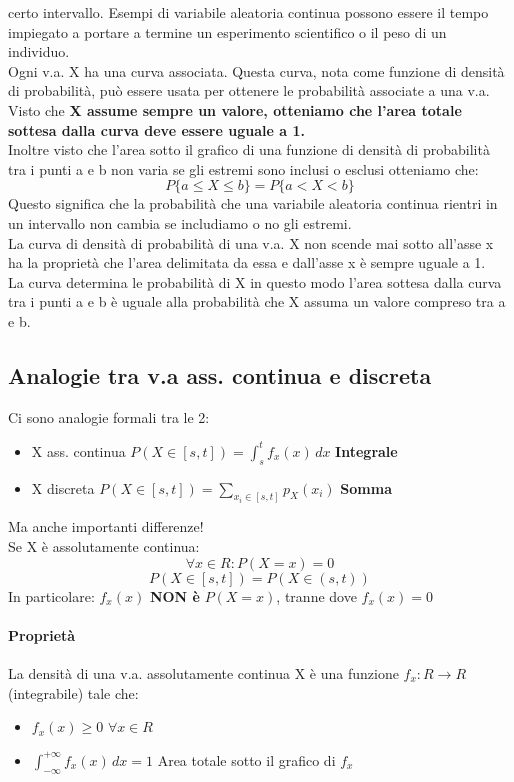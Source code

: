 certo intervallo. Esempi di variabile aleatoria continua possono essere il tempo impiegato a
portare a termine un esperimento scientifico o il peso di un individuo.
\\ Ogni v.a. X ha una curva associata. Questa curva, nota come funzione di densità
di probabilità, può essere usata per ottenere le probabilità associate a una v.a.
\\ Visto che \textbf{X assume sempre un valore, otteniamo che l'area totale sottesa dalla curva
deve essere uguale a 1.}
\\ Inoltre visto che l'area sotto il grafico di una funzione di densità di probabilità
tra i punti a e b non varia se gli estremi sono inclusi o esclusi otteniamo che:
\begin{equation*}
    P\{a \leq X \leq b\} = P\{a < X < b \}
\end{equation*}
Questo significa che la probabilità che una variabile aleatoria continua rientri in un
intervallo non cambia se includiamo o no gli estremi.
\\ La curva di densità di probabilità di una v.a. X non scende mai sotto all'asse x ha la
proprietà che l'area delimitata da essa e dall'asse x è sempre uguale a 1.
\\ La curva determina le probabilità di X in questo modo l'area sottesa dalla curva tra i punti a
e b è uguale alla probabilità che X assuma un valore compreso tra a e b.

\subsection*{Analogie tra v.a ass. continua e discreta}
Ci sono analogie formali tra le 2: \begin{itemize}
    \item X ass. continua $P(X \in [s, t]) = \int_{s}^{t} f_x (x) \,dx$ \textbf{Integrale}
    \item X discreta $P(X \in [s, t]) = \sum_{x_i \in [s,t]}p_X (x_i)$ \textbf{Somma}
\end{itemize}
Ma anche importanti differenze!
\\ Se X è assolutamente continua:
\begin{equation*}
    \forall x \in R: P(X=x) = 0
\end{equation*}
\begin{equation*}
    P(X \in [s,t]) = P(X \in (s, t))
\end{equation*}
In particolare: $f_x (x)$ \textbf{NON è} $P(X=x)$, tranne dove $f_x (x) = 0$
\paragraph*{Proprietà} La densità di una v.a. assolutamente continua X è una funzione 
$f_x : R \to R$ (integrabile) tale che: \begin{itemize}
    \item $f_x (x) \geq 0$ $\forall x \in R$
    \item $\int_{-\infty}^{+\infty} f_x (x) \,dx = 1$ Area 
    totale sotto il grafico di $f_x$
\end{itemize}
